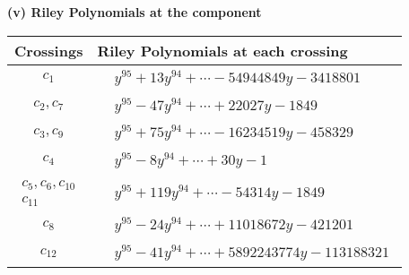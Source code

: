 \documentclass[1p]{elsarticle_modified}
\theoremstyle{definition}
\begin{document}
\newpage\renewcommand{\arraystretch}{1}
\flushleft \textbf{(v) Riley Polynomials at the component}\newline \\
\begin{tabular}{m{50pt}|m{274pt}}
Crossings & \hspace{64pt}Riley Polynomials at each crossing \\
\hline $$\begin{aligned}c_{1}\end{aligned}$$&$\begin{aligned}
&y^{95}+13 y^{94}+\cdots-54944849 y-3418801
\end{aligned}$\\
\hline $$\begin{aligned}c_{2},c_{7}\end{aligned}$$&$\begin{aligned}
&y^{95}-47 y^{94}+\cdots+22027 y-1849
\end{aligned}$\\
\hline $$\begin{aligned}c_{3},c_{9}\end{aligned}$$&$\begin{aligned}
&y^{95}+75 y^{94}+\cdots-16234519 y-458329
\end{aligned}$\\
\hline $$\begin{aligned}c_{4}\end{aligned}$$&$\begin{aligned}
&y^{95}-8 y^{94}+\cdots+30 y-1
\end{aligned}$\\
\hline $$\begin{aligned}c_{5},c_{6},c_{10}\\c_{11}\end{aligned}$$&$\begin{aligned}
&y^{95}+119 y^{94}+\cdots-54314 y-1849
\end{aligned}$\\
\hline $$\begin{aligned}c_{8}\end{aligned}$$&$\begin{aligned}
&y^{95}-24 y^{94}+\cdots+11018672 y-421201
\end{aligned}$\\
\hline $$\begin{aligned}c_{12}\end{aligned}$$&$\begin{aligned}
&y^{95}-41 y^{94}+\cdots+5892243774 y-113188321
\end{aligned}$\\
\hline
\end{tabular}\\~\\
\end{document}
